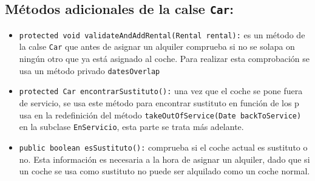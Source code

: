 \subsection*{Métodos adicionales de la calse \texttt{Car}:}
\begin{itemize}
    \item \texttt{protected void validateAndAddRental(Rental rental):} es un método de la calse \texttt{Car} que antes de asignar un alquiler comprueba si 
    no se solapa on ningún otro que ya está asignado al coche. Para realizar esta comprobación se usa un método privado  \texttt{datesOverlap}        
    \item \texttt{protected Car encontrarSustituto():} una vez que el coche se pone fuera de servicio, se usa este método para encontrar sustituto en función de los 
    p usa en la redefinición del método \texttt{takeOutOfService(Date backToService)} en la
    subclase \texttt{EnServicio}, esta parte se trata más adelante. 
    \item \texttt{public boolean esSustituto():} comprueba si el coche actual es sustituto o no. Esta información es necesaria a la hora de 
    asignar un alquiler, dado que si un coche se usa como sustituto no puede ser alquilado como un coche normal.   
    
\end{itemize}
